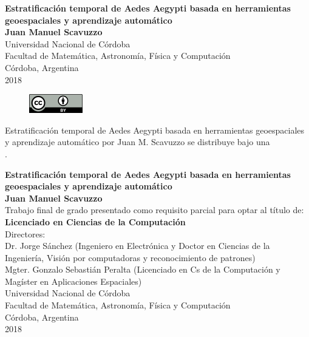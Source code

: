 \begin{center}
\begin{figure}
\centering%
%
\end{figure}
\thispagestyle{empty} \vspace*{0.1cm} \textbf{\huge
Estratificación temporal de Aedes Aegypti basada en herramientas geoespaciales y aprendizaje automático}\\[4.5cm]
\Large\textbf{Juan Manuel Scavuzzo}\\[0.5cm]
\small Universidad Nacional de Córdoba\\
Facultad de Matemática, Astronomía, Física y Computación\\
Córdoba, Argentina\\
2018\\

\begin{figure}[H]
\centering
\href{http://creativecommons.org/licenses/by/4.0/}{
\includegraphics[scale=0.95]{images/cc_by}}
\end{figure}
    \footnotesize Estratificación temporal de Aedes Aegypti basada en herramientas geoespaciales y aprendizaje automático por Juan M. Scavuzzo se distribuye bajo una \\
    \href{http://creativecommons.org/licenses/by/4.0/}{\color{blue}{Licencia Creative Commons Atribución-NoComercial-CompartirIgual 4.0 Internacional}}.

\end{center}

\newpage{\pagestyle{empty}\cleardoublepage}

\newpage
\begin{center}
\thispagestyle{empty} \vspace*{0cm} \textbf{\huge
Estratificación temporal de Aedes Aegypti basada en herramientas geoespaciales y aprendizaje automático}\\[6.0cm]
\Large\textbf{Juan Manuel Scavuzzo}\\[2.0cm]
\small Trabajo final de grado presentado como requisito parcial para optar al
título de:\\
\textbf{Licenciado en Ciencias de la Computación}\\[2.0cm]
Directores:\\

Dr. Jorge Sánchez (Ingeniero en Electrónica y Doctor en Ciencias de la Ingeniería, Visión por computadoras y reconocimiento de patrones)\\
Mgter. Gonzalo Sebastián Peralta (Licenciado en Cs de la Computación y Magíster en Aplicaciones Espaciales)\\ [2.0cm]

Universidad Nacional de Córdoba\\
Facultad de Matemática, Astronomía, Física y Computación\\
Córdoba, Argentina\\
2018\\\end{center}


